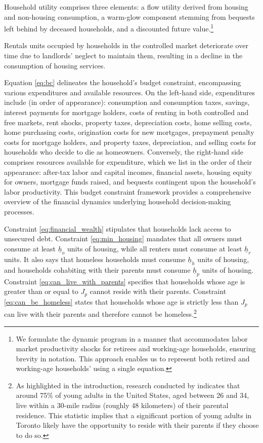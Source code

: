 \documentclass[parskip=full]{article}
\begin{document}
\noindent Household utility comprises three elements: a flow utility derived from housing and non-housing consumption, a warm-glow component stemming from bequests left behind by deceased households, and a discounted future value.\footnote{We formulate the dynamic program in a manner that accommodates labor market productivity shocks for retirees and working-age households, ensuring brevity in notation. This approach enables us to represent both retired and working-age households' using a single equation.}

Rentals units occupied by households in the controlled market deteriorate over time due to landlords' neglect to maintain them, resulting in a decline in the consumption of housing services.

Equation \eqref{eq:bc} delineates the household's budget constraint, encompassing various expenditures and available resources. On the left-hand side, expenditures include (in order of appearance): consumption and consumption taxes, savings, interest payments for mortgage holders, costs of renting in both controlled and free markets, rent shocks, property taxes, depreciation costs, home selling costs, home purchasing costs, origination costs for new mortgages, prepayment penalty costs for mortgage holders, and property taxes, depreciation, and selling costs for households who decide to die as homeowners. Conversely, the right-hand side comprises resources available for expenditure, which we list in the order of their appearance: after-tax labor and capital incomes, financial assets, housing equity for owners, mortgage funds raised, and bequests contingent upon the household's labor productivity. This budget constraint framework provides a comprehensive overview of the financial dynamics underlying household decision-making processes.

Constraint \eqref{eq:financial_wealth} stipulates that households lack access to unsecured debt. Constraint \eqref{eq:min_housing} mandates that all owners must consume at least $\underline{h}_{o}$ units of housing, while all renters must consume at least $\underline{h}_{r}$ units. It also says that homeless households must consume $\underline{h}_{h}$ units of housing, and households cohabiting with their parents must consume $\underline{h}_{p}$ units of housing. Constraint \eqref{eq:can_live_with_parents} specifies that households whose age is greater than or equal to $J_{p}$ cannot reside with their parents. Constraint \eqref{eq:can_be_homeless} states that households whose age is strictly less than $J_{p}$ can live with their parents and therefore cannot be homeless.\footnote{As highlighted in the introduction, research conducted by \citet{spatial_distance-2020} indicates that around 75\% of young adults in the United States, aged between 26 and 34, live within a 30-mile radius (roughly 48 kilometers) of their parental residence. This statistic implies that a significant portion of young adults in Toronto likely have the opportunity to reside with their parents if they choose to do so.}
\end{document}

